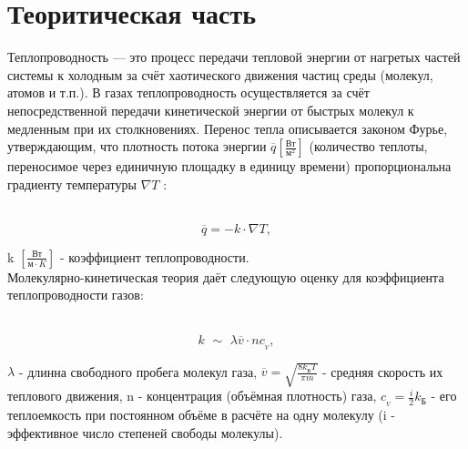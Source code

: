 

    \newcommand{\formula}[3]
    {
        \noindent#1\\[0.1cm]
        \begin{equation}\label{#2}
            #3
        \end{equation}
    }

    \newcommand{\mth}[1]
    {
        \begin{math}
            #1
        \end{math}
    }

    \newcommand{\ruB}[1]
    {
        _{\text{#1}}
    }

\section{\Large Теоритическая часть }

\noindent\hspace{1cm}Теплопроводность — это процесс передачи тепловой энергии от нагретых частей системы к холодным за счёт хаотического движения частиц среды (молекул, атомов и т.п.). В газах теплопроводность осуществляется за счёт непосредственной передачи кинетической энергии от быстрых молекул к медленным при их столкновениях. Перенос тепла описывается законом Фурье, утверждающим, что плотность потока энергии \mth{\overline{q} \left[ \frac{\text{Вт}}{\text{м}^2} \right]} (количество теплоты, переносимое через единичную площадку в единицу времени) пропорциональна градиенту температуры \mth{\nabla T}:

\formula
{}
{Fourier}
{\overline{q} = -k \cdot \nabla T,}

 k\mth{\left[ \frac{\text{Вт}}{\text{м}\cdot K} \right]} - коэффициент теплопроводности. \\[0.2cm]

\noindent\hspace{1cm}Молекулярно-кинетическая теория даёт следующую оценку для коэффициента теплопроводности газов:

\formula
{}
{approxK}
{k \,\, \mathtt{\sim} \,\, \lambda \overline{v}\cdot nc_{_{V}},}

 \mth{\lambda} - длинна свободного пробега молекул газа, \mth{\overline{v} = \sqrt{\frac{8k\ruB{Б}T}{\pi m}}} - средняя скорость их теплового движения, n - концентрация (объёмная плотность) газа, \mth{c_{_V} = \frac{i}{2}k\ruB{Б}} - его теплоемкость при постоянном объёме в расчёте на одну молекулу (i - эффективное число степеней свободы молекулы). \\[0.2cm]

